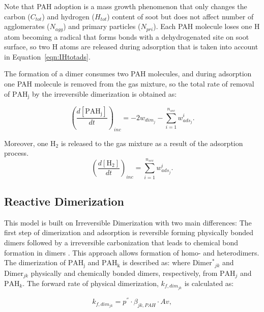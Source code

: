 Note that PAH adoption is a mass growth phenomenon that only changes the carbon ($C_{tot}$) and hydrogen ($H_{tot}$) content of soot but does not affect number of agglomerates ($N_{agg}$) and primary particles ($N_{pri}$). Each PAH molecule loses one H atom becoming a radical that forms bonds with a dehydrogenated site on soot surface, so two H atoms are released during adsorption that is taken into account in Equation~\eqref{eqn:IHtotads}.

The formation of a dimer consumes two PAH molecules, and during adsorption one PAH molecule is removed from the gas mixture, so the total rate of removal of $\mathrm{PAH_j}$ by the irreversible dimerization is obtained as:

\begin{equation}
	\left(
	\frac{d\left[{\mathrm{PAH_j}}\right]}{dt}
	\right)_{inc}
	= 
	-2w_{dim_j}-\sum_{i=1}^{n_{sec}}w^i_{ads_j}
	\label{eqn:PAHscrub_irrevdim}.
\end{equation}

Moreover, one $\mathrm{H_2}$ is released to the gas mixture as a result of the adsorption process.
\begin{equation}
	\left(
	\frac{d\left[{\mathrm{H_2}}\right]}{dt}
	\right)_{inc}
	= 
	\sum_{i=1}^{n_{sec}}w^i_{ads_j}
	\label{eqn:H2scrub_irrevdim}.
\end{equation}


\subsection{Reactive Dimerization}
This model is built on Irreversible Dimerization with two main differences: The first step of dimerization and adsorption is reversible forming physically bonded dimers followed by a irreversible carbonization that leads to chemical bond formation in dimers \citep{kholghy2018reactive}. This approach allows formation of homo- and heterodimers. The dimerization of $\mathrm{PAH_j}$ and $\mathrm{PAH_k}$ is described as:
\noindent where $\mathrm{Dimer^*}_{jk}$ and $\mathrm{Dimer}_{jk}$ physically and chemically bonded dimers, respectively, from $\mathrm{PAH}_j$ and $\mathrm{PAH}_k$. The forward rate of physical dimerization, ${k_{f,dim_{jk}}}$ is calculated as:

\begin{equation}
	k_{f,dim_{jk}}=
	p^{''}\cdot\beta_{jk,PAH}\cdot Av
	\label{eqn:kfphydim_reacdim},
\end{equation}


